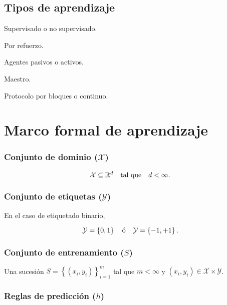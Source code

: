 \documentclass[8pt,a4paper]{extarticle}
\begin{document}
\begin{multicols}{3}
	\subsection*{Tipos de aprendizaje}

	\begin{bulletlist}
		\item Supervisado o no supervisado.
		\item Por refuerzo.
		\item Agentes pasivos o activos.
		\item Maestro.
		\item Protocolo por bloques o continuo.
	\end{bulletlist}

	\newpage

	\section{Marco formal de aprendizaje}

	\subsubsection*{Conjunto de dominio ($\mathcal{X}$)}

	$$\mathcal{X} \subseteq \mathbb{R}^d\quad \text{\normalfont tal que} \quad d < \infty.$$

	\subsubsection*{Conjunto de etiquetas ($\mathcal{Y}$)}

	En el caso de etiquetado binario, \par $$\mathcal{Y} = \left\{ 0,1 \right\}\quad \text{\normalfont ó}\quad \mathcal{Y} = \left\{ -1,+1 \right\} .$$

	\subsubsection*{Conjunto de entrenamiento ($S$)}

	Una sucesión $\displaystyle S = \left\{ \left( x_i, y_i \right)  \right\}_{i = 1}^m $ tal que $m < \infty$ y $\left( x_i, y_i \right) \in \mathcal{X} \times \mathcal{Y}$.

	\subsubsection*{Reglas de predicción ($h$)}


\end{multicols}
\end{document}
